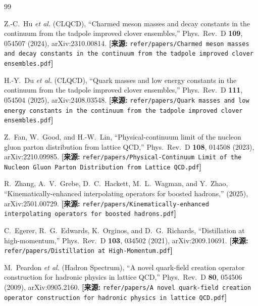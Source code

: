 \documentclass[12pt,a4paper]{ctexart}
\theoremstyle{definition}
\begin{document}
\begin{thebibliography}{99}

Z.-C.~Hu \textit{et al.} (CLQCD),
``Charmed meson masses and decay constants in the continuum from the tadpole improved clover ensembles,''
Phys.\ Rev.\ D \textbf{109}, 054507 (2024), arXiv:2310.00814.
\quad\textbf{[来源:} \texttt{refer/papers/Charmed meson masses and decay constants in the continuum from the tadpole improved clover ensembles.pdf}\textbf{]}

H.-Y.~Du \textit{et al.} (CLQCD),
``Quark masses and low energy constants in the continuum from the tadpole improved clover ensembles,''
Phys.\ Rev.\ D \textbf{111}, 054504 (2025), arXiv:2408.03548.
\quad\textbf{[来源:} \texttt{refer/papers/Quark masses and low energy constants in the continuum from the tadpole improved clover ensembles.pdf}\textbf{]}

Z.~Fan, W.~Good, and H.-W.~Lin,
``Physical-continuum limit of the nucleon gluon parton distribution from lattice QCD,''
Phys.\ Rev.\ D \textbf{108}, 014508 (2023), arXiv:2210.09985.
\quad\textbf{[来源:} \texttt{refer/papers/Physical-Continuum Limit of the Nucleon Gluon Parton Distribution from Lattice QCD.pdf}\textbf{]}

R.~Zhang, A.~V.~Grebe, D.~C.~Hackett, M.~L.~Wagman, and Y.~Zhao,
``Kinematically-enhanced interpolating operators for boosted hadrons,''
(2025), arXiv:2501.00729.
\quad\textbf{[来源:} \texttt{refer/papers/Kinematically-enhanced interpolating operators for boosted hadrons.pdf}\textbf{]}

C.~Egerer, R.~G.~Edwards, K.~Orginos, and D.~G.~Richards,
``Distillation at high-momentum,''
Phys.\ Rev.\ D \textbf{103}, 034502 (2021), arXiv:2009.10691.
\quad\textbf{[来源:} \texttt{refer/papers/Distillation at High-Momentum.pdf}\textbf{]}

M.~Peardon \textit{et al.} (Hadron Spectrum),
``A novel quark-field creation operator construction for hadronic physics in lattice QCD,''
Phys.\ Rev.\ D \textbf{80}, 054506 (2009), arXiv:0905.2160.
\quad\textbf{[来源:} \texttt{refer/papers/A novel quark-field creation operator construction for hadronic physics in lattice QCD.pdf}\textbf{]}

\end{thebibliography}
\end{document}
